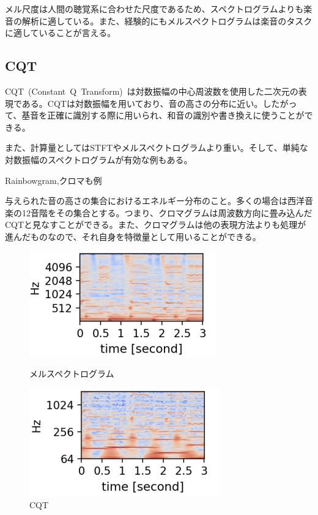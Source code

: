 メル尺度は人間の聴覚系に合わせた尺度であるため、スペクトログラムよりも楽音の解析に適している。また、経験的にもメルスペクトログラムは楽音のタスクに適していることが言える。%

\subsection{CQT}

CQT~(Constant~Q~Transform)~は対数振幅の中心周波数を使用した二次元の表現である。CQTは対数振幅を用いており、音の高さの分布に近い。したがって、基音を正確に識別する際に用いられ、和音の識別や書き換えに使うことができる。

また、計算量としてはSTFTやメルスペクトログラムより重い。そして、単純な対数振幅のスペクトログラムが有効な例もある。

Rainbowgram,クロマも例

与えられた音の高さの集合におけるエネルギー分布のこと。多くの場合は西洋音楽の12音階をその集合とする。つまり、クロマグラムは周波数方向に畳み込んだCQTと見なすことができる。また、クロマグラムは他の表現方法よりも処理が進んだものなので、それ自身を特徴量として用いることができる。

\begin{figure}[b]
\centering
\begin{minipage}[b]{0.48\columnwidth}
\centering
\includegraphics[width=\columnwidth]{figure/mel.png}
\caption{メルスペクトログラム}
\label{fig:mel}
\end{minipage}
\begin{minipage}[b]{0.48\columnwidth}
\centering
\includegraphics[width=\columnwidth]{figure/cqt.png}
\caption{CQT}
\label{fig:cqt}
\end{minipage}
\end{figure}
    